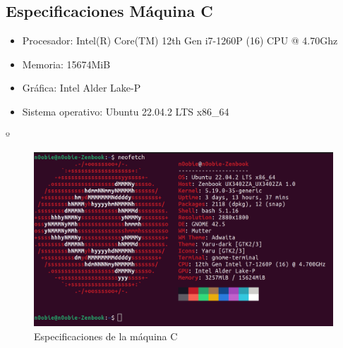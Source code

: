 \newpage

\subsection{Especificaciones Máquina C}
\label{maquina_C}
\begin{itemize}
    \item Procesador: Intel(R) Core(TM) 12th Gen i7-1260P (16) CPU @ 4.70Ghz
    \item Memoria: 15674MiB
    \item Gráfica: Intel Alder Lake-P
    \item Sistema operativo: Ubuntu 22.04.2 LTS x86\_64
\end{itemize}
º
\begin{figure}[ht!]
    \centering
    \includegraphics[width=\textwidth]{archivos/img/anexos/maquinaC.png}
    \caption{Especificaciones de la máquina C}
    \label{fig:maquinaC}
\end{figure}
